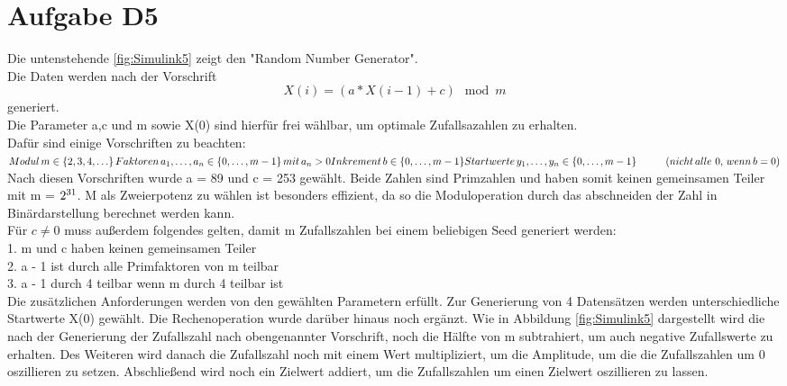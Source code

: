 
\chapter{Aufgabe D5}
Die untenstehende \autoref{fig:Simulink5} zeigt den "Random Number Generator". \\
Die Daten werden nach der Vorschrift$$ X(i) = (a*X(i-1)+c)\mod m$$ generiert.\\
Die Parameter a,c und m sowie X(0) sind hierfür frei wählbar, um optimale Zufallsazahlen zu erhalten.\\
Dafür sind einige Vorschriften zu beachten:\\ 
$ Modul \thinspace {\displaystyle m\in \{2,3,4,\ldots \}} \\
\thinspace Faktoren\thinspace {\displaystyle a_{1},\ldots ,a_{n}\in \left\{0,\ldots ,m-1\right\}}\thinspace mit \thinspace{\displaystyle a_{n}>0}\\
Inkrement\thinspace {\displaystyle b\in \left\{0,\ldots ,m-1\right\}}\\
Startwerte \thinspace{\displaystyle y_{1},\ldots ,y_{n}\in \left\{0,\ldots ,m-1\right\}} \hspace{1cm}(nicht\thinspace alle\thinspace\thinspace 0, \thinspace wenn\thinspace {\displaystyle b=0} )
$\\

Nach diesen Vorschriften wurde a = 89 und c = 253 gewählt. Beide Zahlen sind Primzahlen und haben somit keinen gemeinsamen Teiler mit m = $2\textsuperscript{31}$.
M als Zweierpotenz zu wählen ist besonders effizient, da so die Moduloperation durch das abschneiden der Zahl in Binärdarstellung berechnet werden kann.\\
Für $c \neq 0$ muss außerdem folgendes gelten, damit m Zufallszahlen bei einem beliebigen Seed generiert werden:\\
1. m und c haben keinen gemeinsamen Teiler\\
2. a - 1 ist durch alle Primfaktoren von m teilbar\\
3. a - 1 durch 4 teilbar wenn  m durch 4 teilbar ist\\
Die zusätzlichen  Anforderungen werden von den gewählten Parametern erfüllt. Zur Generierung von 4 Datensätzen werden unterschiedliche Startwerte X(0) gewählt.
Die Rechenoperation wurde darüber hinaus noch ergänzt. Wie in Abbildung \autoref{fig:Simulink5} dargestellt wird die nach der Generierung der Zufallszahl nach obengenannter Vorschrift, noch die Hälfte von m subtrahiert, um auch negative Zufallswerte zu erhalten. Des Weiteren wird danach die Zufallszahl noch mit einem Wert multipliziert, um die Amplitude, um die die Zufallszahlen um 0 oszillieren zu setzen. Abschließend wird noch ein Zielwert addiert, um die Zufallszahlen um einen Zielwert oszillieren zu lassen.


